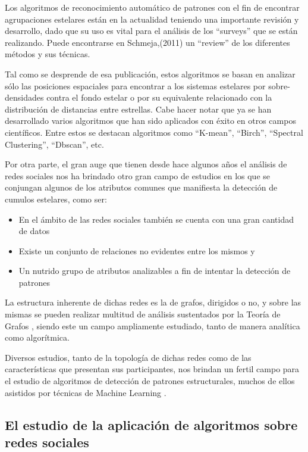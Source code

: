 \documentclass[
	11pt,oneside,a4paper,
	headsepline,footsepline,plainfootsepline,plainheadsepline,
	fleqn,
]{article}
\begin{document}
Los algoritmos de reconocimiento automático de patrones con el fin de encontrar agrupaciones estelares están en la actualidad teniendo una importante revisión y desarrollo, dado que su uso es vital para el análisis de los “surveys” que se están realizando. Puede encontrarse en Schmeja,(2011) \cite{Schmeja2011} un “review” de los diferentes métodos y sus técnicas.

Tal como se desprende de esa publicación, estos algoritmos se basan en analizar sólo las posiciones espaciales para encontrar a los sistemas estelares por sobre-densidades contra el fondo estelar o por su equivalente relacionado con la distribución de distancias entre estrellas. Cabe hacer notar que ya se han desarrollado varios algoritmos que han sido aplicados con éxito en otros campos científicos. Entre estos se destacan algoritmos como “K-mean”, “Birch”, “Spectral Clustering”, “Dbscan”, etc.

Por otra parte, el gran auge que tienen desde hace algunos años el análisis de redes sociales nos ha brindado otro gran campo de estudios en los que se conjungan algunos de los atributos comunes que manifiesta la detección de cumulos estelares, como ser:

\begin{itemize}
	\item En el ámbito de las redes sociales también se cuenta con una gran cantidad de datos
	\item Existe un conjunto de relaciones no evidentes entre los mismos y
	\item Un nutrido grupo de atributos analizables a fin de intentar la detección de patrones 
\end{itemize}

La estructura inherente de dichas redes es la de grafos, dirigidos o no, y sobre las mismas se pueden realizar multitud de análisis sustentados por la Teoría de Grafos \cite{West2001}, siendo este un campo ampliamente estudiado, tanto de manera analítica como algorítmica.

Diversos estudios, tanto de la topología de dichas redes \cite{Barnes1983} como de las características que presentan sus participantes, nos brindan un fertil campo para el estudio de algoritmos de detección de patrones estructurales, muchos de ellos asistidos por técnicas de Machine Learning \cite{Alharbi2021}.

\subsection{El estudio de la aplicación de algoritmos sobre redes sociales}
\end{document}
